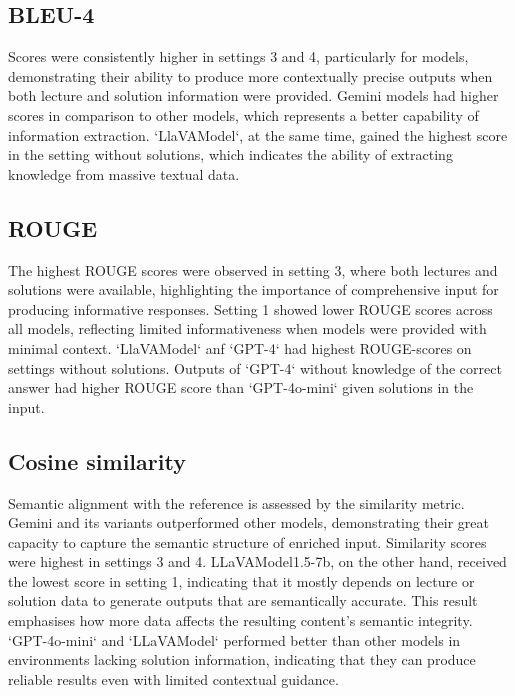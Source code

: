 \documentclass[10pt]{article}
\begin{document}
\subsection{BLEU-4}
Scores were consistently higher in settings 3 and 4, particularly for  models, demonstrating their ability to produce more contextually precise outputs when both lecture and solution information were provided. Gemini models had higher scores in comparison to other models, which represents a better capability of information extraction. `LlaVAModel`, at the same time, gained the highest score in the setting without solutions, which indicates the ability of extracting knowledge from massive textual data.


\subsection{ROUGE}
The highest ROUGE scores were observed in setting 3, where both lectures and solutions were available, highlighting the importance of comprehensive input for producing informative responses. Setting 1 showed lower ROUGE scores across all models, reflecting limited informativeness when models were provided with minimal context.  `LlaVAModel` anf `GPT-4` had highest ROUGE-scores on settings without solutions. Outputs of `GPT-4` without knowledge of the correct answer had higher ROUGE score than `GPT-4o-mini` given solutions in the input.


\subsection{Cosine similarity}
Semantic alignment with the reference is assessed by the similarity metric. Gemini and its variants outperformed other models, demonstrating their great capacity to capture the semantic structure of enriched input. Similarity scores were highest in settings 3 and 4. LLaVAModel1.5-7b, on the other hand, received the lowest score in setting 1, indicating that it mostly depends on lecture or solution data to generate outputs that are semantically accurate. This result emphasises how more data affects the resulting content's semantic integrity. `GPT-4o-mini` and `LLaVAModel` performed better than other models in environments lacking solution information, indicating that they can produce reliable results even with limited  contextual guidance.
\end{document}
